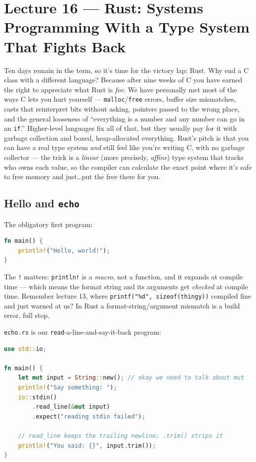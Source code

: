 \documentclass[11pt]{article}
\begin{document}
\section{Lecture 16 --- Rust: Systems Programming With a Type System That Fights Back}

Ten days remain in the term, so it's time for the victory lap: Rust.
Why end a C class with a different language? Because after nine weeks
of C you have earned the right to appreciate what Rust is \emph{for}.
We have personally met most of the ways C lets you hurt yourself ---
\texttt{malloc}/\texttt{free} errors, buffer size mismatches, casts
that reinterpret bits without asking, pointers passed to the wrong
place, and the general looseness of ``everything is a number and any
number can go in an \texttt{if}.'' Higher-level languages fix all of
that, but they usually pay for it with garbage collection and boxed,
heap-allocated everything. Rust's pitch is that you can have a real
type system \emph{and} still feel like you're writing C, with no
garbage collector --- the trick is a \emph{linear} (more precisely,
\emph{affine}) type system that tracks who owns each value, so the
compiler can calculate the exact point where it's safe to free memory
and just\ldots put the free there for you.

\subsection*{Hello and \texttt{echo}}

The obligatory first program:

\begin{lstlisting}[language=Rust]
fn main() {
    println!("Hello, world!");
}
\end{lstlisting}

The \texttt{!} matters: \texttt{println!} is a \emph{macro}, not a
function, and it expands at compile time --- which means the format
string and its arguments get \emph{checked} at compile time. Remember
lecture 13, where \texttt{printf("\%d", sizeof(thingy))} compiled fine
and just warned at us? In Rust a format-string/argument mismatch is a
build error, full stop.

\texttt{echo.rs} is our \texttt{read}-a-line-and-say-it-back program:

\begin{lstlisting}[language=Rust]
use std::io;

fn main() {
    let mut input = String::new(); // okay we need to talk about mut
    println!("Say something: ");
    io::stdin()
        .read_line(&mut input)
        .expect("reading stdin failed");

    // read_line keeps the trailing newline; .trim() strips it
    println!("You said: {}", input.trim());
}
\end{lstlisting}
\end{document}

